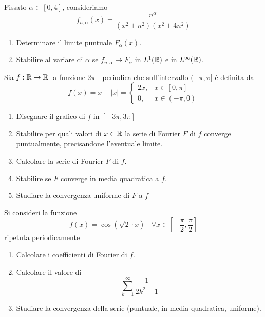 Fissato $\alpha \in [ 0,4]$, consideriamo
\begin{equation*}
f_{n,\alpha }(x) = \frac{n^{\alpha }}{\left(x^{2} + n^{2}\right)\left(x^{2} + 4n^{2}\right)}
\end{equation*}
\begin{enumerate}
\item Determinare il limite puntuale $F_{\alpha }(x)$.
\item Stabilire al variare di $\alpha $ se $f_{n,\alpha }\rightarrow F_{\alpha }$ in $L^{1}(\mathbb{R})$ e in $L^{\infty }(\mathbb{R})$.
\end{enumerate}
\Esercizio{}

Sia $f:\mathbb{R} \rightarrow \mathbb{R} $ la funzione $2\pi $ - periodica che sull'intervallo $(- \pi ,\pi ]$ è definita da
\begin{equation*}
f(x) = x + | x| = \begin{cases}
2x, & x\in [ 0,\pi ]\\
0, & x\in (- \pi ,0)
\end{cases}
\end{equation*}
\begin{enumerate}
\item Disegnare il grafico di $f$ in $[ - 3\pi ,3\pi ]$
\item Stabilire per quali valori di $x\in \mathbb{R} $ la serie di Fourier $F$ di $f$ converge puntualmente, precisandone l'eventuale limite.
\item Calcolare la serie di Fourier $F$ di $f$.
\item Stabilire se $F$ converge in media quadratica a $f$.
\item Studiare la convergenza uniforme di $F$ a $f$
\end{enumerate}
\Esercizio{}

Si consideri la funzione
\begin{equation*}
f(x) = \cos\left(\sqrt{2} \cdot x\right) \ \ \ \ \forall x\in \left[ - \frac{\pi }{2} ,\frac{\pi }{2}\right]
\end{equation*}
ripetuta periodicamente
\begin{enumerate}
\item Calcolare i coefficienti di Fourier di $f$.
\item Calcolare il valore di\begin{equation*}
\sum\limits ^{\infty }_{k = 1}\frac{1}{2k^{2} - 1}
\end{equation*}
\item Studiare la convergenza della serie (puntuale, in media quadratica, uniforme).
\end{enumerate}
\ParteSoluzioni
\Soluzione

